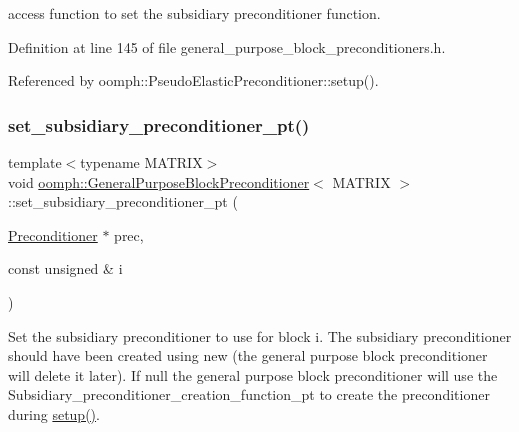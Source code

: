 access function to set the subsidiary preconditioner function. 



Definition at line 145 of file general\+\_\+purpose\+\_\+block\+\_\+preconditioners.\+h.



Referenced by oomph\+::\+Pseudo\+Elastic\+Preconditioner\+::setup().

\mbox{\label{classoomph_1_1GeneralPurposeBlockPreconditioner_acf2035f5dc4fb56ec593a3e3850689fb}} 
\subsubsection{\texorpdfstring{set\+\_\+subsidiary\+\_\+preconditioner\+\_\+pt()}{set\_subsidiary\_preconditioner\_pt()}}
{\footnotesize\ttfamily template$<$typename M\+A\+T\+R\+IX$>$ \\
void \hyperlink{classoomph_1_1GeneralPurposeBlockPreconditioner}{oomph\+::\+General\+Purpose\+Block\+Preconditioner}$<$ M\+A\+T\+R\+IX $>$\+::set\+\_\+subsidiary\+\_\+preconditioner\+\_\+pt (\begin{DoxyParamCaption}\item[{\hyperlink{classoomph_1_1Preconditioner}{Preconditioner} $\ast$}]{prec,  }\item[{const unsigned \&}]{i }\end{DoxyParamCaption})\hspace{0.3cm}{\ttfamily [inline]}}



Set the subsidiary preconditioner to use for block i. The subsidiary preconditioner should have been created using new (the general purpose block preconditioner will delete it later). If null the general purpose block preconditioner will use the Subsidiary\+\_\+preconditioner\+\_\+creation\+\_\+function\+\_\+pt to create the preconditioner during \hyperlink{classoomph_1_1Preconditioner_af4886f4efe510e5c9b0eb19422943588}{setup()}. 



